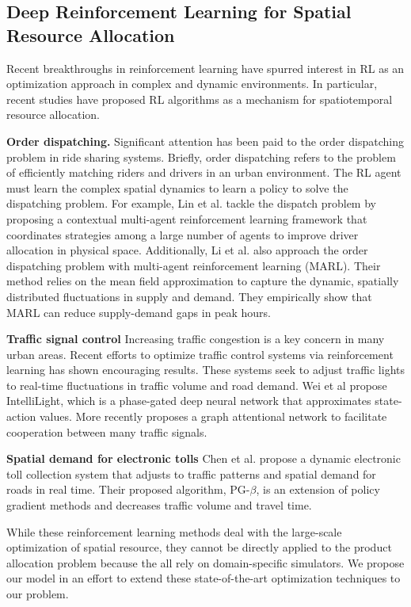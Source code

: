 \subsection{Deep Reinforcement Learning for Spatial Resource Allocation} Recent breakthroughs in reinforcement learning \cite{mnih} \cite{silver-16} \cite{silver-17} have spurred interest in RL as an optimization approach in complex and dynamic environments. In particular, recent studies have proposed RL algorithms as a mechanism for  spatiotemporal resource allocation.

\textbf{Order dispatching.} Significant attention has been paid to the order dispatching problem in ride sharing systems. Briefly, order dispatching refers to the problem of efficiently matching riders and drivers in an urban environment. The RL agent must learn the complex spatial dynamics to learn a policy to solve the dispatching problem. For example, Lin et al. \cite{lin-msu} tackle the dispatch problem by proposing a contextual multi-agent reinforcement learning framework that coordinates strategies among a large number of agents to improve driver allocation in physical space. Additionally, Li et al. \cite{li} also approach the order dispatching problem with multi-agent reinforcement learning (MARL). Their method relies on the mean field approximation to capture the dynamic, spatially distributed fluctuations in supply and demand. They empirically show that MARL can reduce supply-demand gaps in peak hours.

\textbf{Traffic signal control} Increasing traffic congestion is a key concern in many urban areas. Recent efforts to optimize traffic control systems via reinforcement learning has shown encouraging results. These systems seek to adjust traffic lights to real-time fluctuations in traffic volume and road demand. Wei et al \cite{intellilight} propose IntelliLight, which is a phase-gated deep neural network that approximates state-action values. More recently \cite{colight} proposes a graph attentional network to facilitate cooperation between many traffic signals.

\textbf{Spatial demand for electronic tolls} Chen et al. \cite{chen} propose a dynamic electronic toll collection system that adjusts to traffic patterns and spatial demand for roads in real time. Their proposed algorithm, PG-$\beta$, is an extension of policy gradient methods and decreases traffic volume and travel time.


While these reinforcement learning methods deal with the large-scale optimization of spatial resource, they cannot be directly applied to the product allocation problem because the all rely on domain-specific simulators. We propose our model in an effort to extend these state-of-the-art optimization techniques to our problem.
